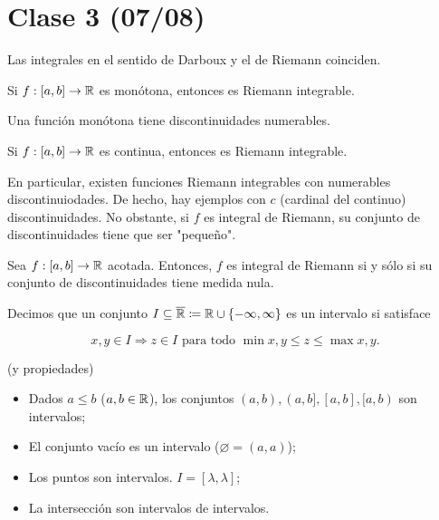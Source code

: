 
	\section{Clase 3 (07/08)}

	\begin{note}
		Las integrales en el sentido de Darboux y el de Riemann coinciden.
	\end{note}

	\begin{prop}
		Si $f:[a,b]\to\mathbb{R}$ es monótona, entonces es Riemann integrable.
	\end{prop}

	\begin{remark}
		Una función monótona tiene discontinuidades numerables.
	\end{remark}

	\begin{prop}
		Si $f:[a,b]\to\mathbb{R}$ es continua, entonces es Riemann integrable.
	\end{prop}

	En particular, existen funciones Riemann integrables con numerables discontinuiodades. De hecho, hay ejemplos con $c$ (cardinal del continuo) discontinuidades. No obstante, si $f$ es integral de Riemann, su conjunto de discontinuidades tiene que ser "pequeño".

	\begin{theorem}
		Sea $f:[a,b]\to\mathbb{R}$ acotada. Entonces, $f$ es integral de Riemann si y sólo si su conjunto de discontinuidades tiene medida nula.
	\end{theorem}

	\begin{definition}[intervalo]
		Decimos que un conjunto $I\subseteq\overline{\mathbb{R}}\coloneq\mathbb{R}\cup \{-\infty,\infty\}$ es un intervalo si satisface

		\[
		x,y\in I \Rightarrow z\in I \text{ para todo } \min x,y\leq z\leq\max x,y.
		\]
	\end{definition}

	\begin{eg}
		(y propiedades)
		\begin{itemize}
			\item Dados $a\leq b$ ($a,b\in\mathbb{R}$), los conjuntos $(a,b),(a,b],[a,b],[a,b)$ son intervalos;

			\item El conjunto vacío es un intervalo ($\varnothing = (a,a)$);

			\item Los puntos son intervalos. $I = [\lambda,\lambda]$;

			\item La intersección son intervalos de intervalos.
		\end{itemize}
	\end{eg}

